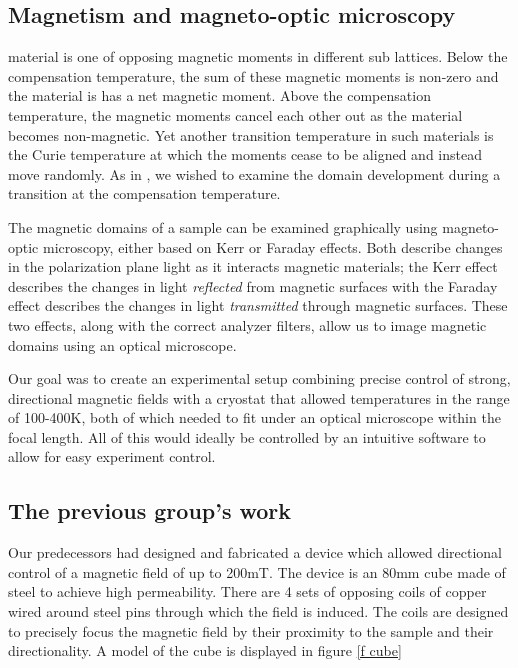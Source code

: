 \documentclass[journal]{IEEEtran}
\begin{document}
\subsection{Magnetism and magneto-optic microscopy}
 material is one of opposing magnetic moments in different sub lattices. Below the compensation temperature, the sum of these magnetic moments is non-zero and the material is has a net magnetic moment. Above the compensation temperature, the magnetic moments cancel each other out as the material becomes non-magnetic. Yet another transition temperature in such materials is the Curie temperature at which the moments cease to be aligned and instead move randomly. As in \cite{garnet}, we wished to examine the domain development during a transition at the compensation temperature.

The magnetic domains of a sample can be examined graphically using magneto-optic microscopy, either based on Kerr or Faraday effects. Both describe changes in the polarization plane light as it interacts magnetic materials; the Kerr effect describes the changes in light \emph{reflected} from magnetic surfaces with the Faraday effect describes the changes in light \emph{transmitted} through magnetic surfaces. These two effects, along with the correct analyzer filters, allow us to image magnetic domains using an optical microscope.

Our goal was to create an experimental setup combining precise control of strong, directional magnetic fields with a cryostat that allowed temperatures in the range of 100-400K, both of which needed to fit under an optical microscope within the focal length. All of this would ideally be controlled by an intuitive software to allow for easy experiment control.

\subsection{The previous group's work}
Our predecessors had designed and fabricated a device which allowed directional control of a magnetic field of up to 200mT. The device is an 80mm cube made of steel to achieve high permeability. There are 4 sets of opposing coils of copper wired around steel pins through which the field is induced. The coils are designed to precisely focus the magnetic field by their proximity to the sample and their directionality. A model of the cube is displayed in figure \ref{f cube}
\end{document}
